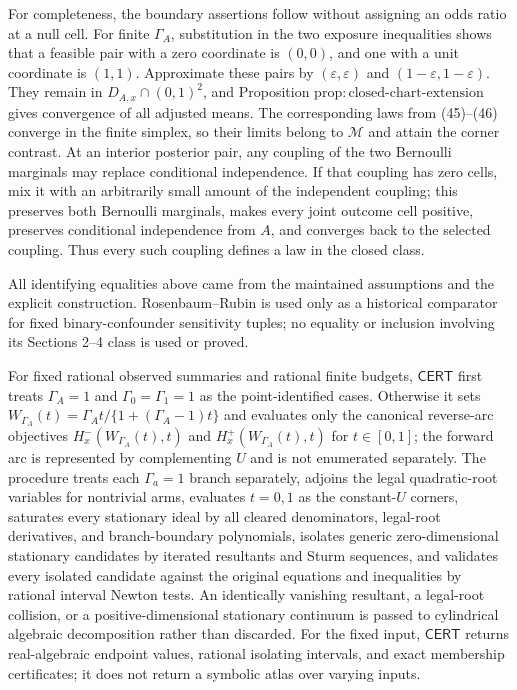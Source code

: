 For completeness, the boundary assertions follow without assigning an odds ratio at a null cell.  For finite \(\Gamma_A\), substitution in the two exposure inequalities shows that a feasible pair with a zero coordinate is \((0,0)\), and one with a unit coordinate is \((1,1)\).  Approximate these pairs by \((\varepsilon,\varepsilon)\) and \((1-\varepsilon,1-\varepsilon)\).  They remain in \(D_{A,x}\cap(0,1)^2\), and Proposition \(\mathrm{prop{:}closed\text{-}chart\text{-}extension}\) gives convergence of all adjusted means.  The corresponding laws from (45)--(46) converge in the finite simplex, so their limits belong to \(\mathcal M\) and attain the corner contrast.  At an interior posterior pair, any coupling of the two Bernoulli marginals may replace conditional independence.  If that coupling has zero cells, mix it with an arbitrarily small amount of the independent coupling; this preserves both Bernoulli marginals, makes every joint outcome cell positive, preserves conditional independence from \(A\), and converges back to the selected coupling.  Thus every such coupling defines a law in the closed class.

All identifying equalities above came from the maintained assumptions and the explicit construction.  Rosenbaum--Rubin is used only as a historical comparator for fixed binary-confounder sensitivity tuples; no equality or inclusion involving its Sections 2--4 class is used or proved.

For fixed rational observed summaries and rational finite budgets, \(\mathsf{CERT}\) first treats \(\Gamma_A=1\) and \(\Gamma_0=\Gamma_1=1\) as the point-identified cases.  Otherwise it sets \(W_{\Gamma_A}(t)=\Gamma_A t/\{1+(\Gamma_A-1)t\}\) and evaluates only the canonical reverse-arc objectives \(H_x^-(W_{\Gamma_A}(t),t)\) and \(H_x^+(W_{\Gamma_A}(t),t)\) for \(t\in[0,1]\); the forward arc is represented by complementing \(U\) and is not enumerated separately.  The procedure treats each \(\Gamma_a=1\) branch separately, adjoins the legal quadratic-root variables for nontrivial arms, evaluates \(t=0,1\) as the constant-\(U\) corners, saturates every stationary ideal by all cleared denominators, legal-root derivatives, and branch-boundary polynomials, isolates generic zero-dimensional stationary candidates by iterated resultants and Sturm sequences, and validates every isolated candidate against the original equations and inequalities by rational interval Newton tests.  An identically vanishing resultant, a legal-root collision, or a positive-dimensional stationary continuum is passed to cylindrical algebraic decomposition rather than discarded.  For the fixed input, \(\mathsf{CERT}\) returns real-algebraic endpoint values, rational isolating intervals, and exact membership certificates; it does not return a symbolic atlas over varying inputs.

